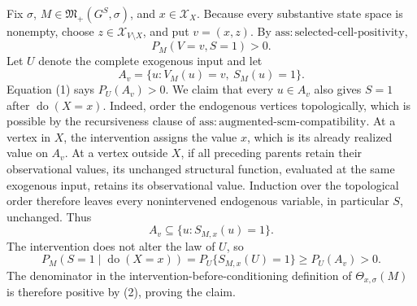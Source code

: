 Fix \(\sigma\), \(M\in\mathfrak M_+(G^S,\sigma)\), and \(x\in\mathcal X_X\).  Because every substantive state space is nonempty, choose \(z\in\mathcal X_{V\setminus X}\), and put \(v=(x,z)\).  By \(\mathrm{ass:selected\text{-}cell\text{-}positivity}\),
\[
  P_M(V=v,S=1)>0. \tag{1}
\]
Let \(U\) denote the complete exogenous input and let
\[
  A_v=\{u:V_M(u)=v,\ S_M(u)=1\}.
\]
Equation (1) says \(P_U(A_v)>0\).  We claim that every \(u\in A_v\) also gives \(S=1\) after \(\operatorname{do}(X=x)\).  Indeed, order the endogenous vertices topologically, which is possible by the recursiveness clause of \(\mathrm{ass:augmented\text{-}scm\text{-}compatibility}\).  At a vertex in \(X\), the intervention assigns the value \(x\), which is its already realized value on \(A_v\).  At a vertex outside \(X\), if all preceding parents retain their observational values, its unchanged structural function, evaluated at the same exogenous input, retains its observational value.  Induction over the topological order therefore leaves every nonintervened endogenous variable, in particular \(S\), unchanged.  Thus
\[
  A_v\subseteq\{u:S_{M,x}(u)=1\}.
\]
The intervention does not alter the law of \(U\), so
\[
  P_M(S=1\mid\operatorname{do}(X=x))
  =P_U\{S_{M,x}(U)=1\}
  \ge P_U(A_v)>0. \tag{2}
\]
The denominator in the intervention-before-conditioning definition of \(\Theta_{x,\sigma}(M)\) is therefore positive by (2), proving the claim.